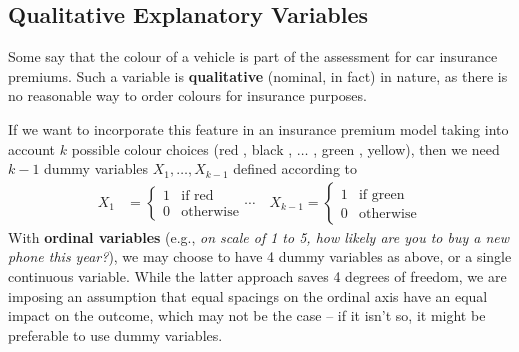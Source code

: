 \subsection{Qualitative Explanatory Variables}
Some say that the colour of a vehicle is part of the assessment for car insurance premiums. Such a variable is \textbf{qualitative} (nominal, in fact) in nature, as there is no reasonable way to order colours for insurance purposes. \par If we want to incorporate this feature in an insurance premium model taking into account $k$ possible colour choices (red , black , $\ldots$ , green , yellow), then we need $k-1$ dummy variables $X_1,\ldots,X_{k-1}$ defined according to  
\begin{align*}
    X_{1} &= 
    \begin{cases}
    1 & \text{if red}\\
    0 & \text{otherwise}
    \end{cases}
 \cdots \quad 
    X_{k-1} = 
    \begin{cases}
    1 & \text{if green}\\
    0 & \text{otherwise}
    \end{cases}
\end{align*}
With \textbf{ordinal variables} (e.g., \textit{on scale of 1 to 5, how likely are you to buy a new phone this year?}), we may choose to have 4 dummy variables as above, or a single continuous variable. \newpage\noindent While the latter approach saves 4 degrees of freedom, we are imposing an assumption that equal spacings on the ordinal axis have an equal impact on the outcome, which may not be the case -- if it isn't so, it might be preferable to use dummy variables.

        
